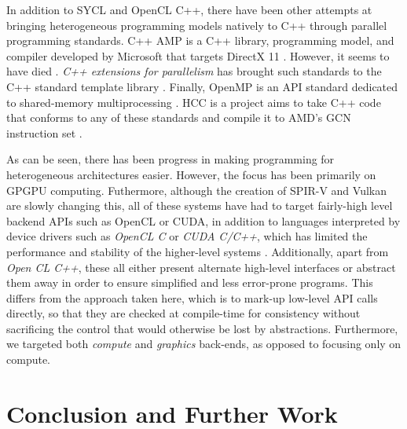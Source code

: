 \documentclass[a4paper,12pt,twoside,openright]{report}
\begin{document}
In addition to SYCL and OpenCL C++, there have been other attempts at bringing
heterogeneous programming models natively to C++ through parallel programming
standards. C++ AMP is a C++ library, programming model, and compiler developed
by Microsoft that targets DirectX 11 \cite{CAMP}. However, it seems to have
died \cite{CAMPFail1} \cite{CAMPFail2}. \textit{C++ extensions for parallelism}
has brought such standards to the C++ standard template library
\cite{CPPParallelism}. Finally, OpenMP is an API standard dedicated to
shared-memory multiprocessing \cite{OpenMP}. HCC is a project aims to take C++
code that conforms to any of these standards and compile it to AMD's GCN
instruction set \cite{HCC}.

As can be seen, there has been progress in making programming for heterogeneous
architectures easier. However, the focus has been primarily on GPGPU computing.
Futhermore, although the creation of SPIR-V and Vulkan are slowly changing
this, all of these systems have had to target fairly-high level backend APIs
such as OpenCL or CUDA, in addition to languages interpreted by device drivers
such as \textit{OpenCL C} or \textit{CUDA C/C++}, which has limited the
performance and stability of the higher-level systems \cite{GLFuzz}.
Additionally, apart from \textit{Open CL C++}, these all either present
alternate high-level interfaces or abstract them away in order to ensure
simplified and less error-prone programs. This differs from the approach taken
here, which is to mark-up low-level API calls directly, so that they are
checked at compile-time for consistency without sacrificing the control that
would otherwise be lost by abstractions. Furthermore, we targeted both
\textit{compute} and \textit{graphics} back-ends, as opposed to focusing only
on compute.



\chapter{Conclusion and Further Work}

\label{chp:conclusion_and_further_work}


\end{document}
